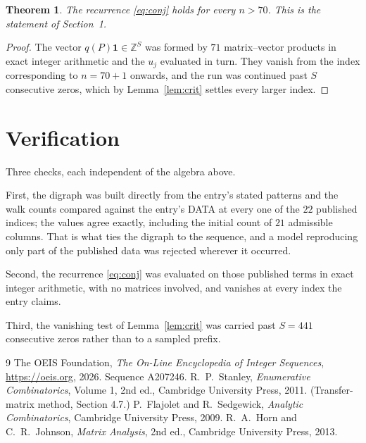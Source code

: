 \documentclass[11pt,a4paper]{article}
\theoremstyle{plain}
\newtheorem{theorem}{Theorem}
\theoremstyle{definition}
\begin{document}
\begin{theorem}
The recurrence \eqref{eq:conj} holds for every $n>70$. This is the statement of
Section~1.
\end{theorem}

\begin{proof}
The vector $q(P)\mathbf{1}\in\mathbb{Z}^{S}$ was formed by $71$ matrix--vector
products in exact integer arithmetic and the $u_j$ evaluated in turn. They vanish from the
index corresponding to $n=70+1$ onwards, and the run was continued past $S$ consecutive
zeros, which by Lemma~\ref{lem:crit} settles every larger index.
\end{proof}

\section{Verification}

Three checks, each independent of the algebra above.

First, the digraph was built directly from the entry's stated patterns and the walk counts
compared against the entry's DATA at every one of the $22$ published indices; the
values agree exactly, including the initial count of $21$ admissible columns. That is
what ties the digraph to the sequence, and a model reproducing only part of the published
data was rejected wherever it occurred.

Second, the recurrence \eqref{eq:conj} was evaluated on those published terms in exact
integer arithmetic, with no matrices involved, and vanishes at every index the entry claims.

Third, the vanishing test of Lemma~\ref{lem:crit} was carried past $S=441$ consecutive
zeros rather than to a sampled prefix.

\begin{thebibliography}{9}
 The OEIS Foundation, \emph{The On-Line Encyclopedia of Integer
Sequences}, \url{https://oeis.org}, 2026. Sequence A207246.
 R.~P.~Stanley, \emph{Enumerative Combinatorics}, Volume 1, 2nd ed.,
Cambridge University Press, 2011. (Transfer-matrix method, Section 4.7.)
 P.~Flajolet and R.~Sedgewick, \emph{Analytic Combinatorics}, Cambridge
University Press, 2009.
 R.~A.~Horn and C.~R.~Johnson, \emph{Matrix Analysis}, 2nd ed., Cambridge
University Press, 2013.
\end{thebibliography}
\end{document}
